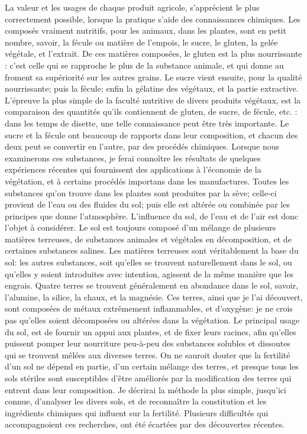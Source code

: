 La valeur et les usages de chaque produit\setcounter{page}{337} agricole, s'apprécient le plus correctement possible, lorsque la pratique s'aide des connaissances chimiques. Les composés vraiment nutritifs, pour les animaux, dans les plantes, sont en petit nombre, savoir, la fécule ou matière de l'empois, le sucre, le gluten, la gelée végétale, et l'extrait. De ces matières composées, le gluten est la plus nourrissante : c'est celle qui se rapproche le plus de la substance animale, et qui donne au froment sa supériorité sur les autres grains. Le sucre vient ensuite, pour la qualité nourrissante; puis la fécule; enfin la gélatine des végétaux, et la partie extractive. L'épreuve la plus simple de la faculté nutritive de divers produits végétaux, est la comparaison des quantités qu'ils contiennent de gluten, de sucre, de fécule, etc. : dans les temps de disette, une telle connaissance peut être très importante. Le sucre et la fécule ont beaucoup de rapports dans leur composition, et chacun des deux peut se convertir en l'autre, par des procédés chimiques. Lorsque nous examinerons ces substances, je ferai connoître les résultats de quelques expériences récentes qui fournissent des applications à l'économie de la végétation, et à certains procédés importans dans les manufactures.\setcounter{page}{338} Toutes les substances qu'on trouve dans les plantes sont produites par la sève; celle-ci provient de l'eau ou des fluides du sol; puis elle est altérée ou combinée par les principes que donne l'atmosphère. L'influence du sol, de l'eau et de l'air est donc l'objet à considérer. Le sol est toujours composé d'un mélange de plusieurs matières terreuses, de substances animales et végétales en décomposition, et de certaines substances salines. Les matières terreuses sont véritablement la base du sol: les autres substances, soit qu'elles se trouvent naturellement dans le sol, ou qu'elles y soient introduites avec intention, agissent de la même manière que les engrais. Quatre terres se trouvent généralement en abondance dans le sol, savoir, l'alumine, la silice, la chaux, et la magnésie. Ces terres, ainsi que je l'ai découvert, sont composées de métaux extrêmement inflammables, et d'oxygène: je ne crois pas qu'elles soient décomposées ou altérées dans la végétation. Le principal usage du sol, est de fournir un appui aux plantes, et de fixer leurs racines, afin qu'elles puissent pomper leur nourriture peu-à-peu des substances solubles et dissoutes qui se trouvent mêlées aux diverses terres. On ne sauroit douter que la fertilité d'un\setcounter{page}{339} sol ne dépend en partie, d'un certain mélange des terres, et presque tous les sols stériles sont susceptibles d'être améliorés par la modification des terres qui entrent dans leur composition. Je décrirai la méthode la plus simple, jusqu'ici connue, d'analyser les divers sols, et de reconnaître la constitution et les ingrédients chimiques qui influent sur la fertilité. Plusieurs difficultés qui accompagnoient ces recherches, ont été écartées par des découvertes récentes.
